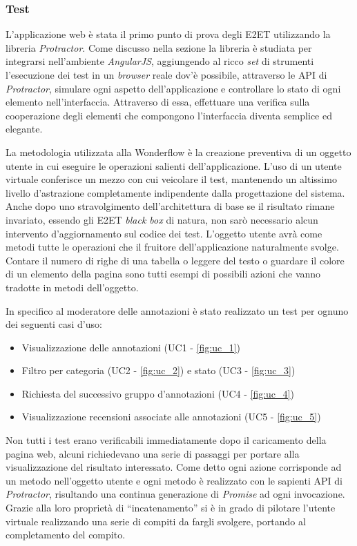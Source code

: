\subsubsection{Test}
L'applicazione web è stata il primo punto di prova degli \gls{E2ET} utilizzando
la libreria \textit{Protractor}. Come discusso nella sezione
 la libreria è studiata per integrarsi nell'ambiente
\textit{AngularJS}, aggiungendo al ricco \textit{set} di strumenti l'esecuzione
dei test in un \textit{browser} reale dov'è possibile, attraverso le \gls{API}
di \textit{Protractor}, simulare ogni aspetto dell'applicazione e controllare
lo stato di ogni elemento nell'interfaccia. Attraverso di essa, effettuare una
verifica sulla cooperazione degli elementi che compongono l'interfaccia diventa
semplice ed elegante.

La metodologia utilizzata alla Wonderflow è la creazione preventiva di un
oggetto utente in cui eseguire le operazioni salienti dell'applicazione. L'uso
di un utente virtuale conferisce un mezzo con cui veicolare il test, mantenendo
un altissimo livello d'astrazione completamente indipendente dalla
progettazione del sistema. Anche dopo uno stravolgimento dell'architettura di
base se il risultato rimane invariato, essendo gli \gls{E2ET} \textit{black box}
di natura, non sarò necessario alcun intervento d'aggiornamento sul codice
dei test. L'oggetto utente avrà come metodi tutte le operazioni che il fruitore
dell'applicazione naturalmente svolge. Contare il numero di righe di una
tabella o leggere del testo o guardare il colore di un elemento della pagina
sono tutti esempi di possibili azioni che vanno tradotte in metodi dell'oggetto.

In specifico al moderatore delle annotazioni è stato realizzato un test per
ognuno dei seguenti casi d'uso:
\begin{itemize}
\item Visualizzazione delle annotazioni (UC1 - \ref{fig:uc_1})
\item Filtro per categoria (UC2 - \ref{fig:uc_2}) e stato (UC3 - \ref{fig:uc_3})
\item Richiesta del successivo gruppo d'annotazioni (UC4 - \ref{fig:uc_4})
\item Visualizzazione recensioni associate alle annotazioni (UC5 -
\ref{fig:uc_5})
\end{itemize}

Non tutti i test erano verificabili immediatamente dopo il caricamento della
pagina web, alcuni richiedevano una serie di passaggi per portare alla
visualizzazione del risultato interessato. Come detto ogni azione corrisponde
ad un metodo nell'oggetto utente e ogni metodo è realizzato con le sapienti
\gls{API} di \textit{Protractor}, risultando una continua generazione di
\textit{Promise} ad ogni invocazione. Grazie alla loro proprietà di
``incatenamento'' si è in grado di pilotare l'utente virtuale realizzando una
serie di compiti da fargli svolgere, portando al completamento del compito.

